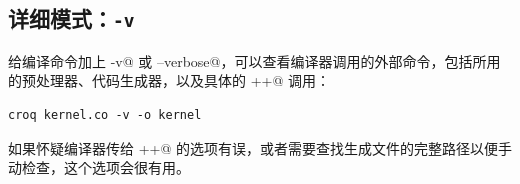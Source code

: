 \subsection*{详细模式：\texttt{-v}}

给编译命令加上 \co@-v@ 或 \co@--verbose@，可以查看编译器调用的外部命令，包括所用的预处理器、代码生成器，以及具体的 \co@c++@ 调用：

\begin{lstlisting}[language=croqtile,caption={开启详细编译日志}]
croq kernel.co -v -o kernel
\end{lstlisting}

如果怀疑编译器传给 \co@c++@ 的选项有误，或者需要查找生成文件的完整路径以便手动检查，这个选项会很有用。
